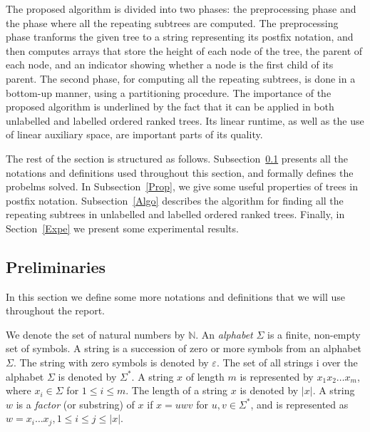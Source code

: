 \documentclass[preprint,12pt]{elsarticle}
\begin{document}
The proposed algorithm is divided into two phases: the preprocessing phase and the
phase where all the repeating subtrees are computed. The preprocessing phase tranforms
the given tree to a string representing its postfix notation, and then computes arrays that store
the height of each node of the tree, the parent of each node, and an indicator showing whether
a node is the first child of its parent. The second phase, for computing all the repeating
subtrees, is done in a bottom-up manner, using a partitioning procedure.
The importance of the proposed algorithm is underlined by the fact that
it can be applied in both unlabelled and labelled ordered ranked trees.
Its linear runtime, as well as the use of linear auxiliary space, are important parts of its quality.

The rest of the section is structured as follows. 
Subsection~\ref{Prel} presents all the notations and definitions used throughout this section, and formally defines the probelms solved. 
In Subsection~\ref{Prop}, we give some useful properties of trees in postfix notation.
Subsection~\ref{Algo} describes the algorithm for finding all the repeating subtrees in unlabelled and labelled ordered ranked trees. 
Finally, in Section~\ref{Expe} we present some experimental results.

\subsection{Preliminaries}
\label{Prel}

In this section we define some more notations and definitions that we will use 
throughout the report.

We denote the set of natural numbers by $\mathbb{N}$. 
An \emph{alphabet} $\Sigma$ is a finite, non-empty set of symbols.
A string is a succession of zero or more symbols from an alphabet $\Sigma$.
The string with zero symbols is denoted by $\varepsilon$. The set of all strings i
over the alphabet $\Sigma$ is denoted by $\Sigma^*$. A string $x$ of length $m$ is 
represented by $x_1 x_2 \ldots x_m$, where $x_i \in \Sigma$ for $ 1 \leq  i \leq m$.
The length of a string $x$ is denoted by $|x|$. A string $w$ is a \emph{factor} 
(or substring) of $x$ if $x=uwv$ for $u,v \in \Sigma^*$, and is represented as 
$w=x_i \ldots x_j, 1\leq i \leq j \leq |x|$.
\end{document}
